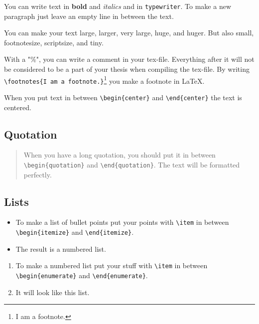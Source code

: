 \documentclass[12pt,final,a4paper,oneside]{book}
\begin{document}
You can write text in \textbf{bold} and \textit{italics} and in \texttt{typewriter}. To make a new paragraph just leave an empty line in between the text.
	
You can make your text {\large large}, {\Large larger}, {\LARGE very large}, {\huge huge}, and {\Huge huger}. But also {\small small}, {\footnotesize footnotesize}, {\scriptsize scriptsize}, and {\tiny tiny}. 

With a "\%", you can write a comment in your tex-file. Everything after it will not be considered to be a part of your thesis when compiling the tex-file. %
By writing \verb|\footnotes{I am a footnote.}|\footnote{I am a footnote.} you make a footnote in \LaTeX.

\begin{center}
	When you put text in between \verb*|\begin{center}| and \verb*|\end{center}| the text is centered.
\end{center}

\subsection{Quotation}
	
\begin{quotation}
	When you have a long quotation, you should put it in between \verb*|\begin{quotation}| and \verb*|\end{quotation}|. The text will be formatted perfectly.	
\end{quotation}
	
\subsection{Lists}
	
\begin{itemize}
	\item To make a list of bullet points put your points with \verb*|\item| in between \verb*|\begin{itemize}| and \verb*|\end{itemize}|. 
	\item The result is a numbered list.	
\end{itemize}
	
\begin{enumerate}
	\item To make a numbered list put your stuff with \verb*|\item| in between \verb*|\begin{enumerate}| and \verb*|\end{enumerate}|. 
	\item It will look like this list.	
\end{enumerate}
	
\end{document}
